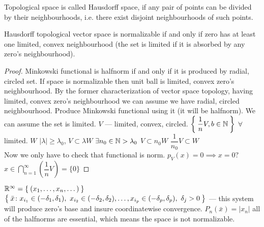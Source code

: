\begin{defn}
  Topological space is called Hausdorff space, if any pair of points can be
  divided by their neighbourhoods, i.e. there exist disjoint neighbourhoods of such points.
\end{defn}

\begin{thm}[Kolmogorov]
  Hausdorff topological vector space is normalizable if and only if zero has at least one 
  limited, convex neighbourhood (the set is limited if it is absorbed by any zero's neighbourhood).
\end{thm}

\begin{proof}
  Minkowski functional is halfnorm if and only if it is produced by radial,
  circled set. If space is normalizable then unit ball is limited, convex zero's
  neighbourhood.
  By the former characterization of vector space topology, having limited, convex zero's
  neighbourhood we can assume we have radial, circled neighbourhood. Produce Minkowski
  functional using it (it will be halfnorm). We can assume the set is limited.
  $V$ --- limited, convex, circled. $\Set{\dfrac{1}{n}V, b \in \mathbb{N}}$
  $\forall$ limited.
  $W$ $|\lambda| \geq \lambda_0$, $V \subset \lambda W$
  $\exists n_0 \in \mathbb{N} > \lambda_0$
  $V \subset n_0 W$ $\dfrac{1}{n_0} V \subset W$ \\
  Now we only have to check that functional is norm.
  $p_V(x) = 0 \implies x = 0?$ \\
  $x \in \bigcap\limits_{n = 1}^\infty \left(\dfrac{1}{n} V\right) = \{0\}$
\end{proof}

\begin{ex}
  $\mathbb{R}^\infty = \Set{(x_1, \dotsc, x_n, \dotsc)}$ \\
  $\Set{\bar{x} \colon x_{i_1} \in (-\delta_1, \delta_1),\ x_{i_2} \in
    (-\delta_2, \delta_2), \dotsc, x_{i_p} \in (-\delta_p, \delta_p),\ \delta_j
    > 0}$ --- this system will produce zero's base and insure coordinatewise
  convergence. $P_n(\bar{x}) = |x_n|$ all of the halfnorms are essential, which
  means the space is not normalizable.
\end{ex}
